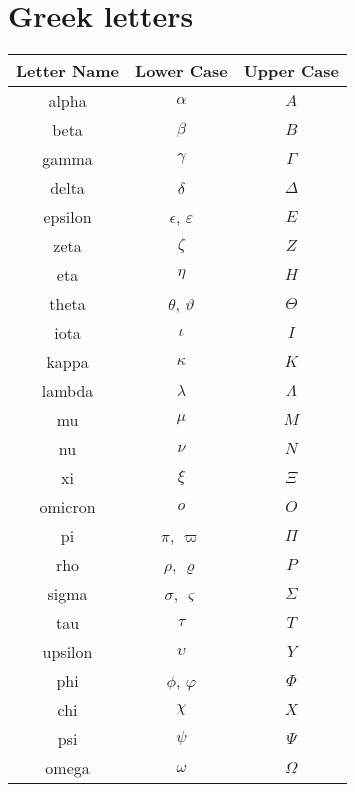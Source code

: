 \chapter{Greek letters}

\begin{center}
	\begin{tabular}{ c | c  c}
		Letter Name & Lower Case                & Upper Case \\ \hline
		alpha       & $\alpha$                  & $A$        \\
		beta        & $\beta$                   & $B$        \\
		gamma       & $\gamma$                  & $\Gamma$   \\
		delta       & $\delta$                  & $\Delta$   \\
		epsilon     & $\epsilon$, $\varepsilon$ & $E$        \\
		zeta        & $\zeta$                   & $Z$        \\
		eta         & $\eta$                    & $H$        \\
		theta       & $\theta$, $\vartheta$     & $\Theta$   \\
		iota        & $\iota$                   & $I$        \\
		kappa       & $\kappa$                  & $K$        \\
		lambda      & $\lambda$                 & $\Lambda$  \\
		mu          & $\mu$                     & $M$        \\
		nu          & $\nu$                     & $N$        \\
		xi          & $\xi$                     & $\Xi$      \\
		omicron     & $o$                       & $O$        \\
		pi          & $\pi$, $\varpi$           & $\Pi$      \\
		rho         & $\rho$, $\varrho$         & $P$        \\
		sigma       & $\sigma$, $\varsigma$     & $\Sigma$   \\
		tau         & $\tau$                    & $T$        \\
		upsilon     & $\upsilon$                & $Y$        \\
		phi         & $\phi$, $\varphi$         & $\Phi$     \\
		chi         & $\chi$                    & $X$        \\
		psi         & $\psi$                    & $\Psi$     \\
		omega       & $\omega$                  & $\Omega$
	\end{tabular}
\end{center}